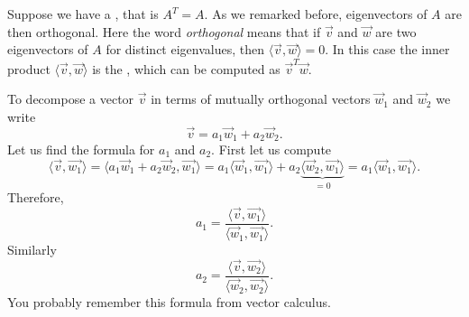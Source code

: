 \documentclass[12pt]{book}
\begin{document}
Suppose we have a \emph{},
that is $A^T = A$.  As we remarked before, 
eigenvectors of $A$ are then orthogonal.  Here the word
\emph{orthogonal} means
that if $\vec{v}$ and $\vec{w}$ are two 
eigenvectors of $A$ for distinct eigenvalues,
then $\langle \vec{v} , \vec{w} \rangle = 0$.
In this case the inner product $\langle \vec{v} , \vec{w} \rangle$
is the \emph{},
which can be computed as $\vec{v}^T\vec{w}$.

To decompose a vector $\vec{v}$ in terms of mutually orthogonal
vectors $\vec{w}_1$ and $\vec{w}_2$ we write
\begin{equation*}
\vec{v} = a_1 \vec{w}_1  + a_2 \vec{w}_2 .
\end{equation*}
Let us find the formula for $a_1$ and $a_2$.  First let us compute
\begin{equation*}
\langle \vec{v} , \vec{w_1} \rangle
=
\langle a_1 \vec{w}_1  + a_2 \vec{w}_2 , \vec{w_1} \rangle
=
a_1 \langle \vec{w}_1 , \vec{w_1} \rangle
+
a_2 \underbrace{\langle \vec{w}_2 , \vec{w_1} \rangle}_{=0}
=
a_1 \langle \vec{w}_1 , \vec{w_1} \rangle .
\end{equation*}
Therefore,
\begin{equation*}
a_1 = 
\frac{\langle \vec{v} , \vec{w_1} \rangle}{
\langle \vec{w}_1 , \vec{w_1} \rangle} .
\end{equation*}
Similarly
\begin{equation*}
a_2 = 
\frac{\langle \vec{v} , \vec{w_2} \rangle}{
\langle \vec{w}_2 , \vec{w_2} \rangle} .
\end{equation*}
You probably remember this formula from vector calculus.
\end{document}
